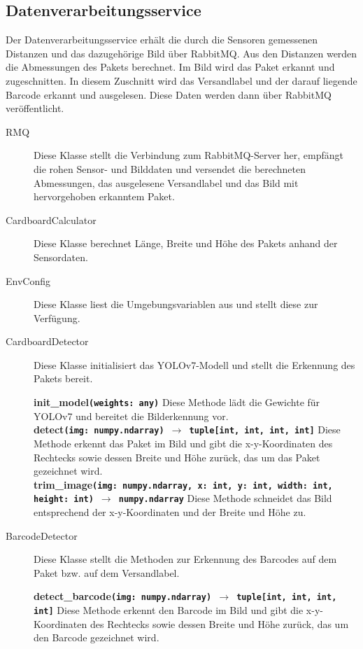 \newpage
\subsection{Datenverarbeitungsservice}

Der Datenverarbeitungsservice erhält die durch die Sensoren gemessenen Distanzen und das dazugehörige Bild über RabbitMQ. Aus den Distanzen werden die Abmessungen des Pakets berechnet. Im Bild wird das Paket erkannt und zugeschnitten. In diesem Zuschnitt wird das Versandlabel und der darauf liegende Barcode erkannt und ausgelesen. Diese Daten werden dann über RabbitMQ veröffentlicht.

\begin{description}
  \item[RMQ] Diese Klasse stellt die Verbindung zum RabbitMQ-Server her, empfängt die rohen Sensor- und Bilddaten und versendet die berechneten Abmessungen, das ausgelesene Versandlabel und das Bild mit hervorgehoben erkanntem Paket.
  \item[CardboardCalculator] Diese Klasse berechnet Länge, Breite und Höhe des Pakets anhand der Sensordaten.
  \item[EnvConfig] Diese Klasse liest die Umgebungsvariablen aus und stellt diese zur Verfügung.
  \item[CardboardDetector] Diese Klasse initialisiert das YOLOv7-Modell und stellt die Erkennung des Pakets bereit.
    \begin{addmargin}{0.2cm}
      \textbf{init\_model\texttt{(weights: any)}} Diese Methode lädt die Gewichte für YOLOv7 und bereitet die Bilderkennung vor. \\
      \textbf{detect\texttt{(img: numpy.ndarray) $\rightarrow$ tuple[int, int, int, int]}} Diese Methode erkennt das Paket im Bild und gibt die x-y-Koordinaten des Rechtecks sowie dessen Breite und Höhe zurück, das um das Paket gezeichnet wird. \\
      \textbf{trim\_image\texttt{(img: numpy.ndarray, x: int, y: int, width: int, height: int)}}\ \linebreak \textbf{\texttt{$\rightarrow$ numpy.ndarray}} Diese Methode schneidet das Bild entsprechend der x-y-Koordinaten und der Breite und Höhe zu.
    \end{addmargin}
  \item[BarcodeDetector] Diese Klasse stellt die Methoden zur Erkennung des Barcodes auf dem  Paket bzw. auf dem Versandlabel.
    \begin{addmargin}{0.2cm}
      \textbf{detect\_barcode\texttt{(img: numpy.ndarray) $\rightarrow$ tuple[int, int, int, int]}} Diese Methode erkennt den Barcode im Bild und gibt die x-y-Koordinaten des Rechtecks sowie dessen Breite und Höhe zurück, das um den Barcode gezeichnet wird. \\

\end{addmargin}
\end{description}
